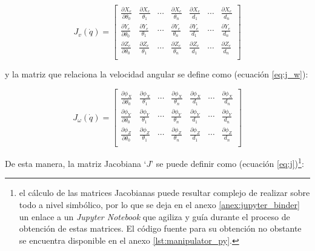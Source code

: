 \begin{equation}\label{eq:j_v}
    J_v\left(\dot{q}\right) = 
    \begin{bmatrix}
        \frac{\partial X_e}{\partial \theta_0} & \frac{\partial X_e}{\theta_1} & \cdots & \frac{\partial X_e}{\theta_n} & \frac{\partial X_e}{d_1} & \cdots & \frac{\partial X_e}{d_n} \\[3ex]
        \frac{\partial Y_e}{\partial \theta_0} & \frac{\partial Y_e}{\theta_1} & \cdots & \frac{\partial Y_e}{\theta_n} & \frac{\partial Y_e}{d_1} & \cdots & \frac{\partial Y_e}{d_n} \\[3ex]
        \frac{\partial Z_e}{\partial \theta_0} & \frac{\partial Z_e}{\theta_1} & \cdots & \frac{\partial Z_e}{\theta_n} & \frac{\partial Z_e}{d_1} & \cdots & \frac{\partial Z_e}{d_n} \\
    \end{bmatrix}
\end{equation}

y la matriz que relaciona la velocidad angular se define como (ecuación \ref{eq:j_w}):

\begin{equation}\label{eq:j_w}
    J_{\omega}\left(\dot{q}\right) =
    \begin{bmatrix}
        \frac{\partial \phi_X}{\partial \theta_0} & \frac{\partial \phi_X}{\theta_1} & \cdots & \frac{\partial \phi_X}{\theta_n} & \frac{\partial \phi_X}{d_1} & \cdots & \frac{\partial \phi_X}{d_n} \\[3ex]
        \frac{\partial \phi_Y}{\partial \theta_0} & \frac{\partial \phi_Y}{\theta_1} & \cdots & \frac{\partial \phi_Y}{\theta_n} & \frac{\partial \phi_Y}{d_1} & \cdots & \frac{\partial \phi_Y}{d_n} \\[3ex]
        \frac{\partial \phi_Z}{\partial \theta_0} & \frac{\partial \phi_Z}{\theta_1} & \cdots & \frac{\partial \phi_Z}{\theta_n} & \frac{\partial \phi_Z}{d_1} & \cdots & \frac{\partial \phi_Z}{d_n} \\
    \end{bmatrix}
\end{equation}

De esta manera, la matriz Jacobiana `$J$' se puede definir como 
(ecuación \ref{eq:j})\footnote{el cálculo de las matrices Jacobianas puede resultar
complejo de realizar sobre todo a nivel simbólico, por lo que se deja en el anexo
\ref{anex:jupyter_binder} un enlace a un \textit{Jupyter Notebook} que agiliza y guía
durante el proceso de obtención de estas matrices. El código fuente para su obtención
no obstante se encuentra disponible en el anexo \ref{lst:manipulator_py}.}:

